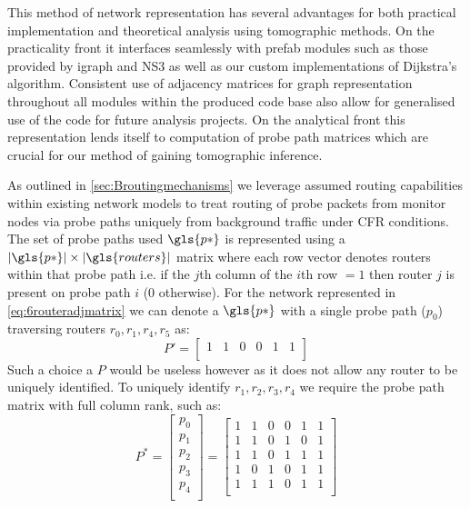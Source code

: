     This method of network representation has several advantages for both practical implementation and theoretical analysis using tomographic methods. On the practicality front it interfaces seamlessly with prefab modules such as those provided by igraph and NS3 as well as our custom implementations of Dijkstra's algorithm. Consistent use of adjacency matrices for graph representation throughout all modules within the produced code base also allow for generalised use of the code for future analysis projects. On the analytical front this representation lends itself to computation of probe path matrices which are crucial for our method of gaining tomographic inference. \par
    As outlined in \cref{sec:Broutingmechanisms} we leverage assumed routing capabilities within existing network models to treat routing of probe packets from monitor nodes via probe paths uniquely from background traffic under CFR conditions. The set of probe paths used $\gls{p*}$ is represented using a $|\gls{p*}|\times |\gls{routers}|$ matrix where each row vector denotes routers within that probe path i.e. if the $j$th column of the $i$th row $= 1$ then router $j$ is present on probe path $i$ (0 otherwise). For the network represented in \cref{eq:6routeradjmatrix} we can denote a $\gls{p*}$ with a single probe path ($p_0$) traversing routers $r_0,r_1,r_4,r_5$ as:
    \[
        P'=\begin{bmatrix}
            1 & 1 & 0 & 0 & 1 & 1\\ 
        \end{bmatrix}
    \]
    Such a choice a $P$ would be useless however as it does not allow any router to be uniquely identified. To uniquely identify $r_1,r_2,r_3,r_4$ we require the probe path matrix with full column rank, such as:
    \begin{equation}
    \label{eq:6routerppaths}
        P^*=\begin{bmatrix}
                p_0 \\
                p_1 \\
                p_2 \\
                p_3 \\
                p_4 \\
        \end{bmatrix} = 
        \begin{bmatrix}
                1 & 1 & 0 & 0 & 1 & 1 \\
                1 & 1 & 0 & 1 & 0 & 1 \\
                1 & 1 & 0 & 1 & 1 & 1 \\
                1 & 0 & 1 & 0 & 1 & 1 \\
                1 & 1 & 1 & 0 & 1 & 1 \\
        \end{bmatrix}
    \end{equation}
